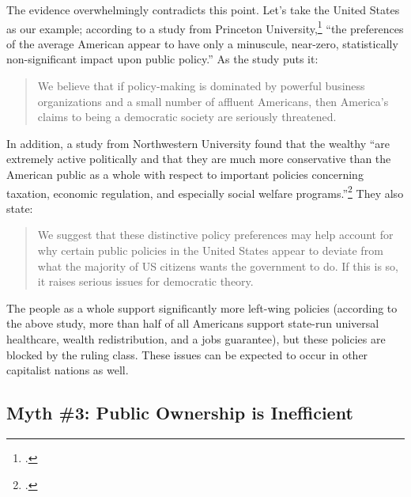 The evidence overwhelmingly contradicts this point.
Let's take the United States as our example; according to a study from Princeton University,\footcite{princeton-theories} ``the preferences of the average American appear to have only a minuscule, near-zero, statistically non-significant impact upon public policy.''
As the study puts it:
\begin{quote}
We believe that if policy-making is dominated by powerful business organizations and a small number of affluent Americans, then America’s claims to being a democratic society are seriously threatened.
\end{quote}
In addition, a study from Northwestern University found that the wealthy ``are extremely active politically and that they are much more conservative than the American public as a whole with respect to important policies concerning taxation, economic regulation, and especially social welfare programs.''\footcite{northwestern-democracy}
They also state:
\begin{quote}
We suggest that these distinctive policy preferences may help account for why certain public policies in the United States appear to deviate from what the majority of US citizens wants the government to do.
If this is so, it raises serious issues for democratic theory.
\end{quote}
The people as a whole support significantly more left-wing policies (according to the above study, more than half of all Americans support state-run universal healthcare, wealth redistribution, and a jobs guarantee), but these policies are blocked by the ruling class.
These issues can be expected to occur in other capitalist nations as well.

\subsection*{Myth \#3: Public Ownership is Inefficient}

